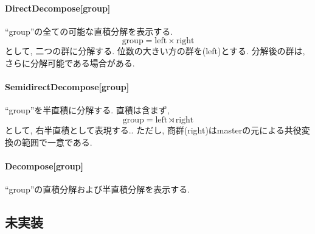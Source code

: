 \documentclass[11pt, a4paper]{jsarticle}
\begin{document}
\paragraph{DirectDecompose[group]}
``group''の全ての可能な直積分解を表示する.
\begin{equation}
\text{group} = \text{left} \times \text{right}
\end{equation}
として, 二つの群に分解する.
位数の大きい方の群を(left)とする.
分解後の群は, さらに分解可能である場合がある.

\paragraph{SemidirectDecompose[group]}
``group''を半直積に分解する.
直積は含まず,
\begin{equation}
\text{group} = \text{left} \rtimes \text{right}
\end{equation}
として, 右半直積として表現する..
ただし, 商群(right)はmasterの元による共役変換の範囲で一意である.

\paragraph{Decompose[group]}
``group''の直積分解および半直積分解を表示する.

\subsection{未実装}







\end{document}
